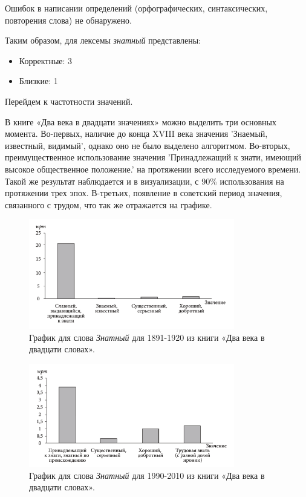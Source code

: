 Ошибок в написании определений (орфографических, синтаксических, повторения слова) не обнаружено.

Таким образом, для лексемы \textit{знатный} представлены:

\begin{itemize}
    \item Корректные: 3
    \item Близкие: 1
\end{itemize}

Перейдем к частотности значений.

В книге «Два века в двадцати значениях» можно выделить три основных момента.
Во-первых, наличие до конца XVIII века значения ’Знаемый, известный, видимый’,
однако оно не было выделено алгоритмом.
Во-вторых, преимущественное использование значения
’Принадлежащий к знати, имеющий высокое общественное положение.’ на протяжении
всего исследуемого времени.
Такой же результат наблюдается и в визуализации, с 90\% использования на протяжении трех эпох.
В-третьих, появление в советский период значения, связанного с трудом,
что так же отражается на графике.

\noindent %
\begin{figure}[H]
    \centering %
    \includegraphics[width=0.8\textwidth]{img/book/znatnij/1891-1920}
    \caption{График для слова \textit{Знатный} для 1891-1920 из книги «Два века в двадцати словах».}
\end{figure}


\begin{figure}[H]
    \centering %
    \includegraphics[width=0.8\textwidth]{img/book/znatnij/1990-2010}
    \caption{График для слова \textit{Знатный} для 1990-2010 из книги «Два века в двадцати словах».}
\end{figure}

